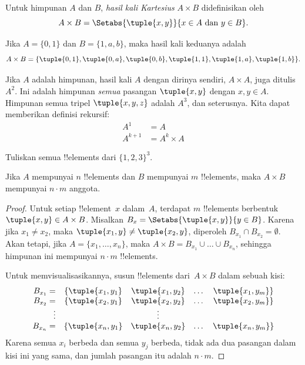 \documentclass[../../../include/open-logic-section]{subfiles}
\begin{document}
\begin{defn}
Untuk himpunan $A$ dan $B$, \emph{hasil kali Kartesius} $A \times B$
didefinisikan oleh
\[
  A \times B = \Setabs{\tuple{x, y}}{x \in A \text{ dan } y \in B}.
\]
\end{defn}

\begin{ex}
Jika $A = \{0, 1\}$ dan $B = \{1, a, b\}$, maka hasil kali keduanya
adalah
\[
A \times B = \{ \tuple{0, 1}, \tuple{0, a}, \tuple{0, b},
    \tuple{1, 1}, \tuple{1, a}, \tuple{1, b} \}.
\]
\end{ex}

\begin{ex}
Jika $A$ adalah himpunan, hasil kali $A$ dengan dirinya sendiri,
$A \times A$, juga ditulis~$A^2$. Ini adalah himpunan \emph{semua}
pasangan $\tuple{x, y}$ dengan $x, y \in A$. Himpunan semua tripel
$\tuple{x, y, z}$ adalah $A^3$, dan seterusnya. Kita dapat memberikan
definisi rekursif:
\begin{align*}
  A^1 & = A\\
  A^{k+1} & = A^k \times A
\end{align*}
\end{ex}

\begin{prob}
Tuliskan semua !!{element}s dari $\{1, 2, 3\}^3$.
\end{prob}

\begin{prop}
Jika $A$ mempunyai $n$ !!{element}s dan $B$ mempunyai $m$
!!{element}s, maka $A \times B$ mempunyai $n\cdot m$ anggota.
\end{prop}

\begin{proof}
Untuk setiap !!{element}~$x$ dalam~$A$, terdapat $m$ !!{element}s
berbentuk $\tuple{x, y} \in A \times B$. Misalkan
$B_x = \Setabs{\tuple{x, y}}{y \in B}$. Karena jika $x_1 \neq x_2$,
maka $\tuple{x_1, y} \neq \tuple{x_2, y}$, diperoleh
$B_{x_1} \cap B_{x_2} = \emptyset$. Akan tetapi, jika
$A = \{x_1, \dots, x_n\}$, maka
$A \times B = B_{x_1} \cup \dots \cup B_{x_n}$, sehingga himpunan
ini mempunyai $n\cdot m$ !!{element}s.

Untuk memvisualisasikannya, susun !!{element}s dari~$A \times B$
dalam sebuah kisi:
\[
\begin{array}{rcccc}
  B_{x_1} = & \{\tuple{x_1, y_1} & \tuple{x_1, y_2} & \dots & \tuple{x_1, y_m}\}\\
  B_{x_2} = & \{\tuple{x_2, y_1} & \tuple{x_2, y_2} & \dots & \tuple{x_2, y_m}\}\\
  \vdots & & \vdots\\
  B_{x_n} = & \{\tuple{x_n, y_1} & \tuple{x_n, y_2} & \dots & \tuple{x_n, y_m}\}
\end{array}
\]
Karena semua $x_i$ berbeda dan semua $y_j$ berbeda, tidak ada dua
pasangan dalam kisi ini yang sama, dan jumlah pasangan itu adalah
$n\cdot m$.
\end{proof}
\end{document}
